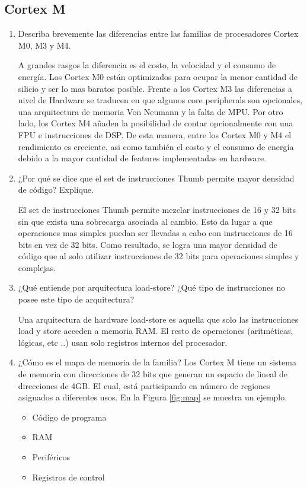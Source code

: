 \documentclass[12pt, a4paper]{article}
\begin{document}
\subsection{Cortex M}
\begin{enumerate}
    \item Describa brevemente las diferencias entre las familias de procesadores Cortex M0, M3 
    y M4.
    
    A grandes rasgos la diferencia es el costo, la velocidad y el consumo de energía. Los 
    Cortex M0 están optimizados para ocupar la menor cantidad de silicio y ser lo mas baratos 
    posible. Frente a los Cortex M3 las diferencias a nivel de Hardware se traducen en
    que algunos core peripherals son opcionales, una arquitectura de memoria Von Neumann y la 
    falta de MPU. Por otro lado, los Cortex M4 añaden la posibilidad de contar opcionalmente 
    con una FPU e instrucciones de DSP. De esta manera, entre los Cortex M0 y M4 el rendimiento
    es creciente, asi como también el costo y el consumo de energía debido a la mayor cantidad 
    de features implementadas en hardware.
    
    \item ¿Por qué se dice que el set de instrucciones Thumb permite mayor densidad de código?
    Explique.
    
    El set de instrucciones Thumb permite mezclar instrucciones de 16 y 32 bits sin que exista una 
    sobrecarga asociada al cambio. Esto da lugar a que operaciones mas simples puedan ser llevadas 
    a cabo con instrucciones de 16 bits en vez de 32 bits. Como resultado, se logra 
    una mayor densidad de código que al solo utilizar instrucciones de 32 bits para operaciones 
    simples y complejas.
        
    \item ¿Qué entiende por arquitectura load-store? ¿Qué tipo de instrucciones no posee este
    tipo de arquitectura?
    
    Una arquitectura de hardware load-store es aquella que solo las instrucciones load y store 
    acceden a memoria RAM. El resto de operaciones (aritméticas, lógicas, etc ..) usan solo 
    registros internos del procesador.
    
    \item ¿Cómo es el mapa de memoria de la familia?
    Los Cortex M tiene un sistema de memoria con direcciones de 32 bits que
    generan un espacio de lineal de direcciones de 4GB. El cual, está participando en 
    número de regiones asignados a diferentes usos. En la Figura \ref{fig:map} se muestra
    un ejemplo.
    \begin{itemize}
        \item Código de programa
        \item RAM
        \item Periféricos
        \item Registros de control
    \end{itemize}
    

\end{enumerate}
\end{document}

